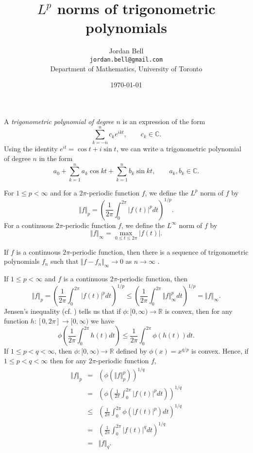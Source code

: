 \documentclass{article}
\newcommand{\norm}[1]{\Vert #1 \Vert}
\begin{document}
\title{$L^p$ norms of trigonometric polynomials}
\author{Jordan Bell\\ \texttt{jordan.bell@gmail.com}\\Department of Mathematics, University of Toronto}
\date{\today}

\maketitle

A {\em trigonometric polynomial of degree $n$} is an expression  of the form
\[
\sum_{k=-n}^n c_k e^{ikt}, \qquad c_k \in \mathbb{C}.
\]
Using the identity $e^{it}=\cos t+i\sin t$, we can write a trigonometric polynomial of degree $n$ in the form
\[
a_0+\sum_{k=1}^n a_k \cos kt + \sum_{k=1}^n b_k \sin kt, \qquad a_k, b_k \in \mathbb{C}.
\]

For $1 \leq p < \infty$ and for a $2\pi$-periodic function $f$, we define the $L^p$ norm of $f$ by
\[
\norm{f}_p=\left(\frac{1}{2\pi} \int_0^{2\pi} |f(t)|^p dt \right)^{1/p}.
\]
For a continuous $2\pi$-periodic function $f$, we define the $L^\infty$ norm of $f$ by
\[
\norm{f}_\infty=\max_{0 \leq t \leq 2\pi} |f(t)|.
\] 


If $f$ is a continuous $2\pi$-periodic function, then there is a sequence of trigonometric polynomials $f_n$ such that
$\norm{f-f_n}_\infty \to 0$ as $n \to \infty$
\cite[p.~54, Corollary~5.4]{steinI}. 

If $1 \leq p < \infty$ and $f$ is a continuous $2\pi$-periodic function, then 
\[
\norm{f}_p = \left( \frac{1}{2\pi} \int_0^{2\pi} |f(t)|^p dt \right)^{1/p} \leq \left( \frac{1}{2\pi} \int_0^{2\pi} \norm{f}_\infty^p dt \right)^{1/p}= \norm{f}_\infty.
\]
Jensen's inequality \cite[p.~44, Theorem 2.2]{lieb} (cf. \cite[p.~113, Problem 7.5]{master}) tells us that if
$\phi:[0,\infty) \to \mathbb{R}$ is convex, then for any function $h:[0,2\pi] \to [0,\infty)$ we have
\[
\phi \left( \frac{1}{2\pi} \int_0^{2\pi} h(t) dt \right) \leq \frac{1}{2\pi} \int_0^{2\pi} \phi(h(t)) dt.
\]
If $1 \leq p < q < \infty$, then $\phi:[0,\infty) \to \mathbb{R}$ defined by $\phi(x)=x^{q/p}$ is convex. Hence, if $1 \leq p < q < \infty$ then for any $2\pi$-periodic function $f$,
\begin{eqnarray*}
\norm{f}_p&=&(\phi(\norm{f}_p^p))^{1/q}\\
&=&\left( \phi\left( \frac{1}{2\pi}\int_0^{2\pi} |f(t)|^p dt \right) \right)^{1/q}\\
&\leq&\left( \frac{1}{2\pi} \int_0^{2\pi} \phi(|f(t)|^p) dt \right)^{1/q}\\
&=&\left( \frac{1}{2\pi} \int_0^{2\pi} |f(t)|^q dt \right)^{1/q}\\
&=&\norm{f}_q.
\end{eqnarray*}
\end{document}
